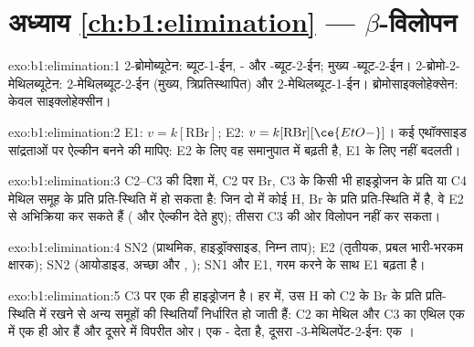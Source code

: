 \section*{अध्याय \ref{ch:b1:elimination} --- \texorpdfstring{$\beta$}{बीटा}-विलोपन}

\begin{solution}{exo:b1:elimination:1}
2-ब्रोमोब्यूटेन: ब्यूट-1-ईन, - और -ब्यूट-2-ईन; मुख्य
-ब्यूट-2-ईन। 2-ब्रोमो-2-मेथिलब्यूटेन: 2-मेथिलब्यूट-2-ईन (मुख्य,
त्रिप्रतिस्थापित) और 2-मेथिलब्यूट-1-ईन। ब्रोमोसाइक्लोहेक्सेन: केवल साइक्लोहेक्सीन।
\end{solution}

\begin{solution}{exo:b1:elimination:2}
E1: $v = k[\mathrm{RBr}]$; E2: $v = k[\mathrm{RBr}][\ce{EtO-}]$। कई एथॉक्साइड
सांद्रताओं पर ऐल्कीन बनने की  मापिए: E2 के लिए वह
समानुपात में बढ़ती है, E1 के लिए नहीं बदलती।
\end{solution}

\begin{solution}{exo:b1:elimination:3}
C2--C3 की दिशा में, C2 पर Br, C3 के किसी भी हाइड्रोजन के प्रति या
C4 मेथिल समूह के प्रति प्रति-स्थिति में हो सकता है: जिन दो  में कोई H, Br के प्रति प्रति-स्थिति में है, वे
E2 से अभिक्रिया कर सकते हैं ( और  ऐल्कीन देते हुए); तीसरा
C3 की ओर विलोपन नहीं कर सकता।
\end{solution}

\begin{solution}{exo:b1:elimination:4}
SN2 (प्राथमिक, हाइड्रॉक्साइड, निम्न ताप); E2 (तृतीयक, प्रबल भारी-भरकम
क्षारक); SN2 (आयोडाइड, अच्छा  और , );
SN1 और E1, गरम करने के साथ E1 बढ़ता है।
\end{solution}

\begin{solution}{exo:b1:elimination:5}
C3 पर एक ही हाइड्रोजन है। हर  में, उस H को C2 के Br के प्रति
प्रति-स्थिति में रखने से अन्य समूहों की स्थितियाँ निर्धारित हो जाती हैं: C2 का मेथिल
और C3 का एथिल एक  में एक ही ओर हैं और दूसरे में
विपरीत ओर। एक - देता है, दूसरा
-3-मेथिलपेंट-2-ईन: एक ।
\end{solution}

